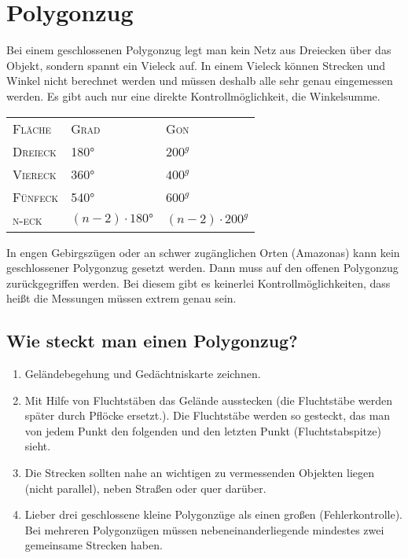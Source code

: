 \section{Polygonzug}
Bei einem geschlossenen Polygonzug legt man kein Netz aus Dreiecken über das Objekt, sondern spannt ein Vieleck auf.
In einem Vieleck können Strecken und Winkel nicht berechnet werden und müssen deshalb alle sehr genau eingemessen werden.
Es gibt auch nur eine direkte Kontrollmöglichkeit, die Winkelsumme.

\vspace{0.5cm}
\begin{tabular}{lll}
\textsc{Fläche} & \textsc{Grad} & \textsc{Gon} \\
\textsc{Dreieck} & \ang{180} & $200^g$ \\
\textsc{Viereck} & \ang{360} & $400^g$ \\
\textsc{Fünfeck} & \ang{540} & $600^g$ \\
\textsc{n-eck} & $(n-2)\cdot \ang{180}$ & $(n-2)\cdot 200^g$ \\
\end{tabular}
\vspace{0.3cm}

In engen Gebirgszügen oder an schwer zugänglichen Orten (\zB Amazonas) kann kein geschlossener Polygonzug gesetzt werden.
Dann muss auf den offenen Polygonzug zurückgegriffen werden.
Bei diesem gibt es keinerlei Kontrollmöglichkeiten, dass heißt die Messungen müssen extrem genau sein.

\subsection{Wie steckt man einen Polygonzug?}
\begin{enumerate}
\item Geländebegehung und Gedächtniskarte zeichnen.
\item Mit Hilfe von Fluchtstäben das Gelände ausstecken (die Fluchtstäbe werden später durch Pflöcke ersetzt.). Die
Fluchtstäbe werden so gesteckt, das man von jedem Punkt den folgenden und den letzten Punkt (Fluchtstabspitze) sieht.
\item Die Strecken sollten nahe an wichtigen zu vermessenden Objekten liegen (nicht parallel), neben Straßen oder quer
darüber.
\item {} Lieber drei geschlossene
kleine Polygonzüge als einen großen (Fehlerkontrolle). Bei mehreren Polygonzügen müssen nebeneinanderliegende mindestes
zwei gemeinsame Strecken haben.
\end{enumerate}


